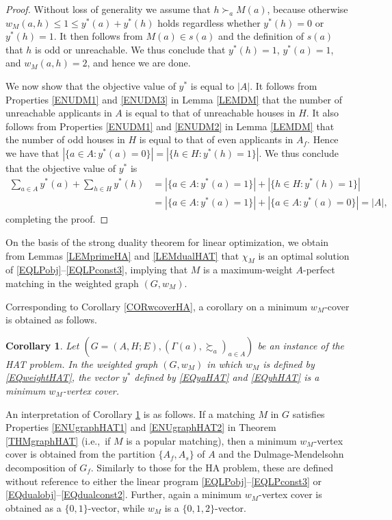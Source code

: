 \documentclass[11pt,a4paper,showkeys]{article}
\theoremstyle{plain}
\newtheorem{corollary}[theorem]{Corollary}
\theoremstyle{definition}
\begin{document}
\begin{proof}
    Without loss of generality 
    we assume that $h \succ_a M(a)$, 
    because otherwise $w_M(a,h)\le 1 \le y^*(a)+y^*(h)$ holds 
    regardless whether $y^*(h)=0$ or $y^*(h)=1$. 
    It then follows from $M(a)\in s(a)$ and the definition of $s(a)$ that $h$ is odd or unreachable. 
    We thus conclude that $y^*(h)=1$, 
    $y^*(a)=1$, and $w_M(a,h)=2$, 
    and hence we are done. 


    We now show that the objective value of $y^*$ is equal to $|A|$. 
    It follows from Properties \ref{ENUDM1} and \ref{ENUDM3} in Lemma \ref{LEMDM} that 
    the number of unreachable applicants in $A$ is equal to that of unreachable houses in $H$. 
    It also follows from Properties \ref{ENUDM1} and \ref{ENUDM2} in Lemma \ref{LEMDM} that 
    the number of odd houses in $H$ is equal to that of even applicants in $A_f$. 
    Hence we have that $|\{a\in A\colon y^*(a)=0\}| = |\{h\in H\colon y^*(h)=1\}| $. 
    We thus conclude that the objective value of $y^*$ is 
    \begin{align*}
        \sum_{a\in A} y^*(a) + \sum_{h\in H} y^*(h)  
        {}&{}= |\{a\in A\colon y^*(a)=1\}| + |\{h\in H\colon y^*(h)=1\}| \\
        {}&{}= |\{a\in A\colon y^*(a)=1\}| + |\{a\in A\colon y^*(a)=0\}| 
        = |A|,
    \end{align*}
    completing the proof. 
\end{proof}

On the basis of the strong duality theorem for linear optimization, 
we obtain from Lemmas \ref{LEMprimeHA} and \ref{LEMdualHAT} that 
$\chi_M$ is an optimal solution of \eqref{EQLPobj}--\eqref{EQLPconst3}, 
implying that $M$ is a maximum-weight $A$-perfect matching in the weighted graph $(G,w_M)$. 

Corresponding to Corollary \ref{CORwcoverHA}, 
a corollary on a minimum $w_M$-cover is obtained as follows. 

\begin{corollary}
\label{CORwcoverHAT}
    Let $(G=(A,H;E),(\Gamma(a),\succsim_a)_{a\in A})$ be an instance of the HAT problem. 
    In the weighted graph $(G,w_M)$ 
    in which $w_M$ is defined by \eqref{EQweightHAT}, 
    the vector $y^*$ defined by \eqref{EQyaHAT} and \eqref{EQyhHAT} is a minimum $w_M$-vertex cover. 
\end{corollary}

An interpretation of Corollary \ref{CORwcoverHAT} is as follows. 
If a matching $M$ in $G$ satisfies Properties \ref{ENUgraphHAT1} and \ref{ENUgraphHAT2} in Theorem \ref{THMgraphHAT} 
(i.e.,\ if $M$ is a popular matching), 
then 
a minimum $w_M$-vertex cover is obtained from the partition $\{A_f,A_s\}$ of $A$ and the Dulmage-Mendelsohn decomposition 
of $G_f$. 
Similarly to those for the HA problem, 
these are defined 
without reference to either the linear program \eqref{EQLPobj}--\eqref{EQLPconst3} or \eqref{EQdualobj}--\eqref{EQdualconst2}.
Further, 
again a minimum $w_M$-vertex cover is obtained as a $\{0,1\}$-vector, 
while $w_M$ is a $\{0,1,2\}$-vector. 
\end{document}
